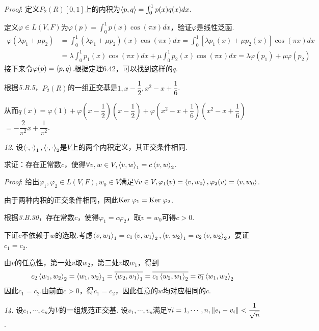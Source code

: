 \textit{Proof}:
定义\(P_2(R)[0,1]\)上的内积为\(\left\langle p,q \right\rangle=\int_{0}^{1} p(x)q(x)dx\).

定义\(\varphi \in L(V,F)\)为\(\varphi(p)=\int_{0}^{1} p(x)\cos(\pi x)dx\)，验证\(\varphi\)是线性泛函.
    \begin{align*}
        \varphi(\lambda p_1+\mu p_2)&=\int_{0}^{1} (\lambda p_1+\mu p_2)(x)\cos(\pi x)dx
        =\int_{0}^{1} [\lambda p_1(x)+\mu p_2(x)]\cos(\pi x)dx \\
        &=\lambda \int_{0}^{1}p_1(x)\cos(\pi x)dx+\mu \int_{0}^{1}p_2(x)\cos(\pi x)dx
        =\lambda \varphi(p_1)+\mu \varphi(p_2)
    \end{align*}
接下来令\(\varphi(p)=\left\langle p,q \right\rangle\).根据定理6.42，可以找到这样的\(q\).

根据\textit{5.B.5}，\(P_2(R)\)的一组正交基是\(1,x-\dfrac{1}{2},x^2-x+\dfrac{1}{6}\).

从而\(q(x)=\varphi(1)+\varphi(x-\dfrac{1}{2})(x-\dfrac{1}{2})+\varphi(x^2-x+\dfrac{1}{6})(x^2-x+\dfrac{1}{6})\)
\(=-\dfrac{2}{\pi^2}x+\dfrac{1}{\pi^2}\).

\hspace*{\fill}

\textit{12.}
设\(\left\langle \cdot,\cdot \right\rangle_1,\left\langle \cdot,\cdot \right\rangle_2\)是\(V\)上的两个内积定义，其正交条件相同.

求证：存在正常数\(c\)，使得\(\forall v,w \in V,\left\langle v,w \right\rangle_1=c\left\langle v,w \right\rangle_2\).

\textit{Proof}:
给出\(\varphi_1,\varphi_2 \in L(V,F),w_0 \in V\)满足\(\forall v \in V,\varphi_1(v)=\left\langle v,w_0 \right\rangle,\varphi_2(v)=\left\langle v,w_0 \right\rangle\).

由于两种内积的正交条件相同，因此\(\mathrm{Ker \;} \varphi_1=\mathrm{Ker \;} \varphi_2\).

根据\textit{3.B.30}，存在常数\(c\)，使得\(\varphi_1=c\varphi_2\)，取\(v=w_0\)可得\(c>0\).

下证\(c\)不依赖于\(w\)的选取.考虑\(\left\langle v,w_1 \right\rangle_1=c_1\left\langle v,w_1 \right\rangle_2,\left\langle v,w_2 \right\rangle_1=c_2\left\langle v,w_2 \right\rangle_2\)，要证\(c_1=c_2\).

由\(v\)的任意性，第一处\(v\)取\(w_2\)，第二处\(v\)取\(w_1\)，得到
    \begin{align*}
        c_2\left\langle w_1,w_2 \right\rangle_2=\left\langle w_1,w_2 \right\rangle_1=\overline{\left\langle w_2,w_1 \right\rangle_1}
        =\overline{c_1\left\langle w_2,w_1 \right\rangle_2}=\overline{c_1}\left\langle w_1,w_2 \right\rangle_2
    \end{align*}
因此\(c_1=\overline{c_2}\).由前面\(c>0\)，得\(c_1=c_2\)，因此任意的\(w\)均对应相同的\(c\).

\hspace*{\fill}

\textit{14.}
设\(e_1,\cdots,e_n\)为\(V\)的一组规范正交基.
设\(v_1,\cdots,v_n\)满足\(\forall i=1,\cdots,n,\left\lVert e_i-v_i \right\rVert<\dfrac{1}{\sqrt{n}}\).

